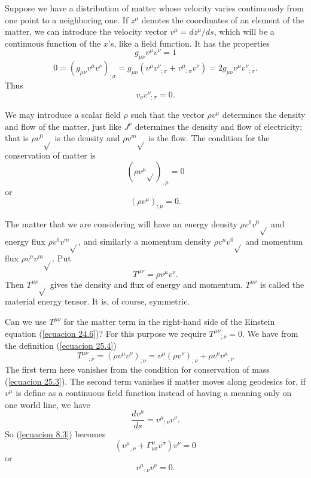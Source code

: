Suppose we have a distribution of matter whose velocity varies continuously from one point to a neighboring one. If 
$z^\mu$ denotes the coordinates of an element of the matter, we can introduce the velocity vector $v^\mu = dz^\mu / d 
s$, which will be a continuous function of the $x$'s, like a field function. It has the properties
\begin{equation}
\label{ecuacion 25.1}
 g_{\mu\nu} v^\mu v^\nu = 1
\end{equation}
\[
0 = (g_{\mu\nu} v^\mu v^\nu)_{;\sigma} 
  = g_{\mu\nu}\left(v^\mu {v^\nu}_{;\sigma} + {v^\mu}_{;\sigma} v^\nu \right) = 2 g_{\mu\nu} v^\mu {v^\nu}_{;\sigma}.
\]
Thus
\begin{equation}
 \label{ecuacion 25.2}
 v_\nu {v^\nu}_{;\sigma} = 0.
\end{equation}

We may introduce a scalar field $\rho$ such that the vector $\rho v^\mu$ determines the density and flow of the matter, 
just like $J^\nu$ determines the density and flow of electricity; that is $\rho v^0 \sqrt{}$ is the density and $\rho 
v^m \sqrt{}$ is the flow. The condition for the conservation of matter is 
\[
\left( \rho v^\mu \sqrt{} \right)_{,\mu} = 0
\]
or
\begin{equation}
 \label{ecuacion 25.3}
 \left( \rho v^\mu \right)_{;\mu} = 0.
\end{equation}

The matter that we are considering will have an energy density $\rho v^0 v^0\sqrt{}$ and energy flux $\rho v^0 v^m 
\sqrt{}$, and similarly a momentum density $\rho v^n v^0 \sqrt{}$ and momentum flux $\rho v^n v^m \sqrt{}$. Put 
\begin{equation}
 \label{ecuacion 25.4}
 T^{\mu\nu} = \rho v^\mu v^\nu.
\end{equation}
Then $T^{\mu\nu}\sqrt{}$ gives the density and flux of energy and momentum. $T^{\mu\nu}$ is called the material energy 
tensor. It is, of course, symmetric.

Can we use $T^{\mu\nu}$ for the matter term in the right-hand side of the Einstein equation (\ref{ecuacion 24.6})? For 
this purpose we require ${T^{\mu\nu}}_{;\nu} = 0$. We have from the definition (\ref{ecuacion 25.4})
\[
    {T^{\mu\nu}}_{;\nu} = \left( \rho v^\mu v^\nu \right)_{;\nu} 
                        = v^\mu \left( \rho v^\nu \right)_{;\nu} + \rho v^\nu {v^\mu}_{;\nu}
\]
The first term here vanishes from the condition for conservation of mass (\ref{ecuacion 25.3}). The second term 
vanishes if matter moves along geodesics for, if $v^\mu$ is define as a continuous field function instead of having a 
meaning only on one world line, we have
\[
 \frac{d v^\mu}{ds} = {v^\mu}_{;\nu}v^\nu.
\]
So (\ref{ecuacion 8.3}) becomes
\[
 \left( {v^\mu}_{,\nu} + \Gamma^\mu_{\nu\sigma}v^\sigma \right) v^\nu = 0
\]
or
\begin{equation}
 \label{ecuacion 25.5}
 {v^\mu}_{;\nu} v^\nu = 0.
\end{equation}

